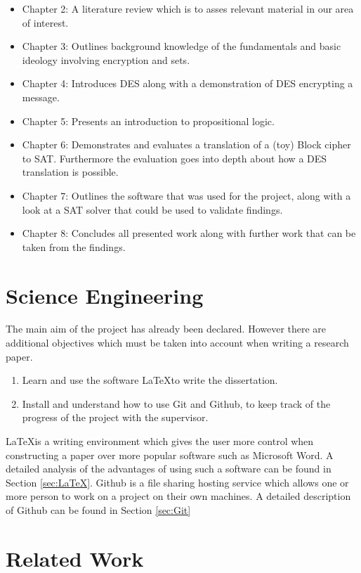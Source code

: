 \documentclass[11pt,a4paper, notitlepage]{report}
\begin{document}
\begin{itemize}
  \item Chapter 2: A literature review which is to asses relevant material in our area of interest. 
  \item Chapter 3: Outlines background knowledge of the fundamentals and basic ideology involving encryption and sets.
  \item Chapter 4: Introduces DES along with a demonstration of DES encrypting a message.
  \item Chapter 5: Presents an introduction to propositional logic.
  \item Chapter 6: Demonstrates and evaluates a translation of a (toy) Block cipher to SAT. Furthermore the evaluation goes into depth about how a DES translation is possible.
  \item Chapter 7: Outlines the software that was used for the project, along with a look at a SAT solver that could be used to validate findings.
  \item Chapter 8: Concludes all presented work along with further work that can be taken from the findings. 
\end{itemize}


\section{Science Engineering}
\label{sec:SciEng}

The main aim of the project has already been declared. However there are additional objectives which must be taken into account when writing a research paper.
\begin{enumerate}
\item Learn and use the software \LaTeX \space to write the dissertation.
\item Install and understand how to use Git and Github, to keep track of the progress of the project with the supervisor.
\end{enumerate}
\LaTeX \space is a writing environment which gives the user more control when constructing a paper over more popular software such as Microsoft Word. A detailed analysis of the advantages of using such a software can be found in Section \ref{sec:LaTeX}.
Github is a file sharing hosting service which allows one or more person to work on a project on their own machines. A detailed description of Github can be found in Section \ref{sec:Git}



\section{Related Work}
\label{cha:RWork}
\end{document}
